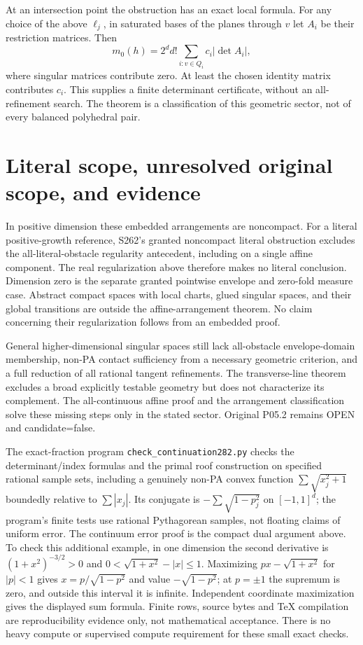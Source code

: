 \documentclass[11pt]{article}
\begin{document}
At an intersection point the obstruction has an exact local formula.
For any choice of the above $\ell_j$, in saturated bases of the
planes through $v$ let $A_i$ be their restriction matrices. Then
\[
 m_0(h)=2^d d!\sum_{i:v\in Q_i}c_i|\det A_i|,
\]
where singular matrices contribute zero. At least the chosen identity
matrix contributes $c_i$. This supplies a finite determinant certificate,
without an all-refinement search. The theorem is a classification of
this geometric sector, not of every balanced polyhedral pair.

\section{Literal scope, unresolved original scope, and evidence}
In positive dimension these embedded arrangements are noncompact.
For a literal positive-growth reference, S262's granted noncompact
literal obstruction excludes the all-literal-obstacle regularity
antecedent, including on a single affine component. The real
regularization above therefore makes no literal conclusion. Dimension
zero is the separate granted pointwise envelope and zero-fold measure
case. Abstract compact spaces with local charts, glued singular spaces,
and their global transitions are outside the affine-arrangement theorem.
No claim concerning their regularization follows from an embedded proof.

General higher-dimensional singular spaces still lack all-obstacle
envelope-domain membership, non-PA contact sufficiency from a necessary
geometric criterion, and a full reduction of all rational tangent
refinements. The transverse-line theorem excludes a broad explicitly
testable geometry but does not characterize its complement. The
all-continuous affine proof and the arrangement classification solve
these missing steps only in the stated sector. Original P05.2 remains
OPEN and candidate=false.

The exact-fraction program \texttt{check\_continuation282.py} checks
the determinant/index formulas and the primal roof construction on
specified rational sample sets, including a genuinely non-PA convex
function $\sum\sqrt{x_j^2+1}$ boundedly relative to $\sum|x_j|$.
Its conjugate is $-\sum\sqrt{1-p_j^2}$ on $[-1,1]^d$; the program's
finite tests use rational Pythagorean samples, not floating claims of
uniform error. The continuum error proof is the compact dual argument
above. To check this additional example, in one dimension the second
derivative is $(1+x^2)^{-3/2}>0$ and
$0<\sqrt{1+x^2}-|x|\leq1$. Maximizing
$px-\sqrt{1+x^2}$ for $|p|<1$ gives
$x=p/\sqrt{1-p^2}$ and value $-\sqrt{1-p^2}$;
at $p=\pm1$ the supremum is zero, and outside this interval it is
infinite. Independent coordinate maximization gives the displayed
sum formula. Finite rows, source bytes and TeX compilation are reproducibility
evidence only, not mathematical acceptance. There is no heavy compute
or supervised compute requirement for these small exact checks.
\end{document}
